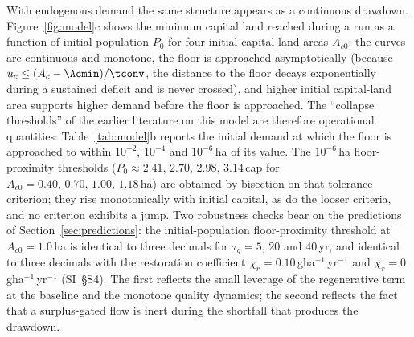 With endogenous demand the same structure appears as a continuous drawdown. Figure~\ref{fig:model}c shows the minimum capital land reached during a run as a function of initial population $P_0$ for four initial capital-land areas $A_{c0}$: the curves are continuous and monotone, the floor is approached asymptotically (because $u_c\le(A_c-\Acmin)/\tconv$, the distance to the floor decays exponentially during a sustained deficit and is never crossed), and higher initial capital-land area supports higher demand before the floor is approached. The ``collapse thresholds'' of the earlier literature on this model are therefore operational quantities: Table~\ref{tab:model}b reports the initial demand at which the floor is approached to within $10^{-2}$, $10^{-4}$ and $10^{-6}$\,ha of its value. The $10^{-6}$\,ha floor-proximity thresholds ($P_0\approx2.41,\,2.70,\,2.98,\,3.14$\,cap for $A_{c0}=0.40,\,0.70,\,1.00,\,1.18$\,ha) are obtained by bisection on that tolerance criterion; they rise monotonically with initial capital, as do the looser criteria, and no criterion exhibits a jump. Two robustness checks bear on the predictions of Section~\ref{sec:predictions}: the initial-population floor-proximity threshold at $A_{c0}=1.0$\,ha is identical to three decimals for $\tau_g=5$, $20$ and $40$\,yr, and identical to three decimals with the restoration coefficient $\chi_r=0.10$\,gha$^{-1}$\,yr$^{-1}$ and $\chi_r=0$\,gha$^{-1}$\,yr$^{-1}$ (SI~\S S4). The first reflects the small leverage of the regenerative term at the baseline and the monotone quality dynamics; the second reflects the fact that a surplus-gated flow is inert during the shortfall that produces the drawdown.

